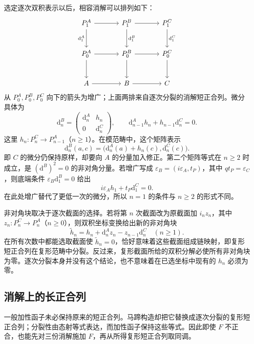 选定逐次双积表示以后，相容消解可以排列如下：
\[
	\begin{tikzcd}[column sep=large,row sep=large]
		P_1^A\arrow[r]\arrow[d,"\mathrm{d}_1^A"']&P_1^B\arrow[r]\arrow[d,"\mathrm{d}_1^B"]&P_1^C\arrow[d,"\mathrm{d}_1^C"]\\
		P_0^A\arrow[r]\arrow[d]&P_0^B\arrow[r]\arrow[d]&P_0^C\arrow[d]\\
		A\arrow[r]&B\arrow[r]&C
	\end{tikzcd}
\]
从 \(P_0^A,P_0^B,P_0^C\) 向下的箭头为增广；上面两排来自逐次分裂的消解短正合列。微分具体为
\[
	\mathrm{d}_n^B=\begin{pmatrix}\mathrm{d}_n^A&h_n\\0&\mathrm{d}_n^C\end{pmatrix},
	\qquad \mathrm{d}_{n-1}^Ah_n+h_{n-1}\mathrm{d}_n^C=0.
\]
这里 \(h_n:P_n^C\to P_{n-1}^A\)（\(n\ge1\)）。在模范畴中，这个矩阵表示
\[
	\mathrm{d}_n^B(a,c) =\bigl(\mathrm{d}_n^A(a)+h_n(c),\mathrm{d}_n^C(c)\bigr).
\]
即 \(C\) 的微分仍保持原样，却要向 \(A\) 的分量加入修正。第二个矩阵等式在 \(n\ge2\) 时成立，是 \((\mathrm{d}^B)^2=0\) 的非对角分量。若增广写成 \(\varepsilon_B=(i\varepsilon_A,t_P)\)，其中 \(qt_P=\varepsilon_C\)，则底端条件 \(\varepsilon_B\mathrm{d}_1^B=0\) 给出
\[
	i\varepsilon_Ah_1+t_P\mathrm{d}_1^C=0.
\]
在此处增广替代了更低一次的微分，所以 \(n=1\) 的条件与 \(n\ge2\) 的形式不同。

\ProseParagraphBreak
非对角块取决于逐次截面的选择。若将第 \(n\) 次截面改为原截面加 \(i_nz_n\)，其中 \(z_n:P_n^C\to P_n^A\)（\(n\ge0\)），则双积坐标变换给出新的非对角块
\[
	\widetilde h_n =h_n+\mathrm{d}_n^Az_n-z_{n-1}\mathrm{d}_n^C \quad(n\ge1).
\]
在所有次数中都能选取截面使 \(\widetilde h_n=0\)，恰好意味着这些截面组成链映射，即复形短正合列在复形范畴中分裂。反过来，复形截面所给的双积分解必使所有非对角块为零。逐次分裂本身并没有这个结论，也不意味着在已选坐标中现有的 \(h_n\) 必须为零。

\subsection{消解上的长正合列}
\label{b4:subsec:0703:03}

一般加性函子未必保持原来的短正合列。马蹄构造却把它替换成逐次分裂的复形短正合列；分裂性由态射等式表达，而加性函子保持这些等式。因此即使 \(F\) 不正合，也能先对三份消解施加 \(F\)，再从所得复形短正合列取同调。

